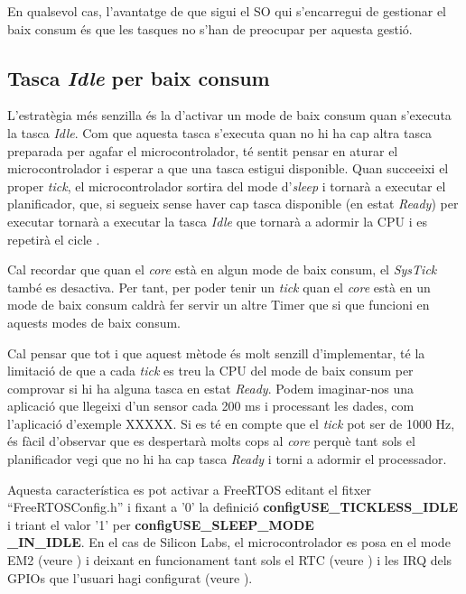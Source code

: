 En qualsevol cas, l'avantatge de que sigui el SO qui s'encarregui de gestionar el baix consum és que les tasques no s'han de preocupar per aquesta gestió.

\subsection{Tasca {\em Idle} per baix consum}
\label{sub:idlelowpower}
L'estratègia més senzilla és la d'activar un mode de baix consum quan s'executa la tasca {\em Idle}. Com que aquesta tasca s'executa quan no hi ha cap altra tasca preparada per agafar el microcontrolador, té sentit pensar en aturar el microcontrolador i esperar a que una tasca estigui disponible. Quan succeeixi el proper {\em tick}, el microcontrolador sortira del mode d'{\em sleep} i tornarà a executar el planificador, que, si segueix sense haver cap tasca disponible (en estat {\em Ready}) per executar tornarà a executar la tasca {\em Idle} que tornarà a adormir la CPU i es repetirà el cicle \cite{FreeRTOSLP}.

\begin{remark}
Cal recordar que quan el {\em core} està en algun mode de baix consum, el {\em SysTick} també es desactiva. Per tant, per poder tenir un {\em tick} quan el {\em core} està en un mode de baix consum caldrà fer servir un altre Timer que si que funcioni en aquests modes de baix consum.
\end{remark}

Cal pensar que tot i que aquest mètode és molt senzill d'implementar, té la limitació de que a cada {\em tick} es treu la CPU del mode de baix consum per comprovar si hi ha alguna tasca en estat {\em Ready}. Podem imaginar-nos una aplicació que llegeixi d'un sensor cada 200 ms i processant les dades, com l'aplicació d'exemple XXXXX. Si es té en compte que el {\em tick} pot ser de 1000 Hz, és fàcil d'observar que es despertarà molts cops al {\em core} perquè tant sols el planificador vegi que no hi ha cap tasca {\em Ready} i torni a adormir el processador.

Aquesta característica es pot activar a FreeRTOS editant el fitxer ``FreeRTOSConfig.h'' i fixant a '0' la definició {\bf configUSE{\_}TICKLESS{\_}IDLE} i triant el valor '1' per {\bf configUSE\_SLEEP\_MODE\\\_IN\_IDLE}. En el cas de Silicon Labs, el microcontrolador es posa en el mode EM2 (veure ) i deixant en funcionament tant sols el RTC (veure ) i les \gls{IRQ} dels GPIOs que l'usuari hagi configurat (veure ).

